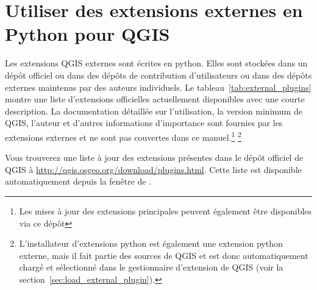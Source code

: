 \section{Utiliser des extensions externes en Python pour QGIS}\label{sec:external_plugins}



Les extensions QGIS externes sont écrites en python. Elles sont stockées dans un dépôt officiel ou dans des dépôts de contribution d'utilisateurs ou dans des dépôts externes maintenus par des auteurs individuels. Le tableau~\ref{tab:external_plugins} montre une liste d'extensions officielles actuellement disponibles avec une courte description. La documentation détaillée sur l'utilisation, la version minimum de QGIS, l'auteur et d'autres informations d'importance sont fournies par les extensions externes et ne sont pas couvertes dans ce manuel.\footnote{Les mises à jour des extensions principales peuvent également être disponibles via ce dépôt} \footnote{L'installateur d'extensions python est également une extension python externe, mais il fait partie des sources de QGIS et est donc automatiquement chargé et sélectionné dans le gestionnaire d'extension de QGIS (voir la section~\ref{sec:load_external_plugin}).}

Vous trouverez une liste à jour des extensions présentes dans le dépôt officiel de QGIS à \url{http://qgis.osgeo.org/download/plugins.html}. Cette liste est disponible automatiquement depuis la fenêtre  de .


